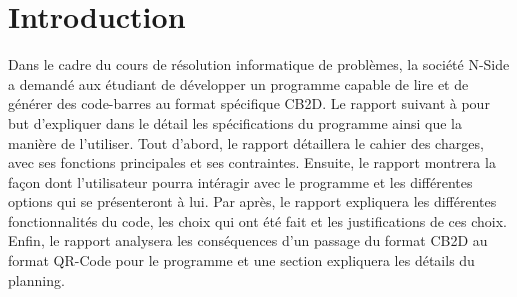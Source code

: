 
\section{Introduction}

Dans le cadre du cours de résolution informatique de problèmes, la société N-Side a demandé aux étudiant de développer un programme capable de lire et de générer des code-barres au format spécifique CB2D. Le rapport suivant à pour but d'expliquer dans le détail les spécifications du programme ainsi que la manière de l'utiliser. Tout d'abord, le rapport détaillera le cahier des charges, avec ses fonctions principales et ses contraintes. Ensuite, le rapport montrera la façon dont l'utilisateur pourra intéragir avec le programme et les différentes options qui se présenteront à lui. Par après, le rapport expliquera les différentes fonctionnalités du code, les choix qui ont été fait et les justifications de ces choix. Enfin, le rapport analysera les conséquences d'un passage du format CB2D au format QR-Code pour le programme et une section expliquera les détails du planning. 

